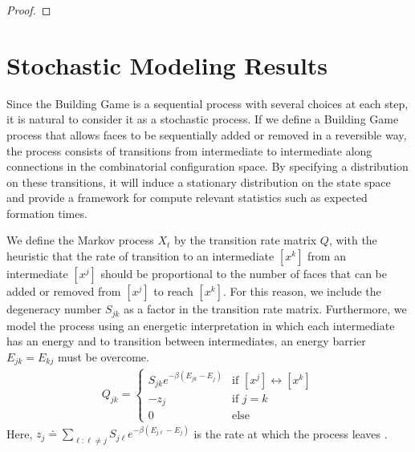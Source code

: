 \begin{proof}
\end{proof}


\section{Stochastic Modeling Results}
\label{sec:StochMod}
Since the Building Game is a sequential process with several choices at each step, it is natural to consider it as a stochastic process. If we define a Building Game process that allows faces to be sequentially added or removed in a reversible way, the process consists of transitions from intermediate to intermediate along connections in the combinatorial configuration space. By specifying a distribution on these transitions, it will induce a stationary distribution on the state space and provide a framework for compute relevant statistics such as expected formation times.





We define the Markov process $X_t$ by the transition rate matrix $Q$, with the heuristic that the rate of transition to an intermediate $[x^k]$ from an intermediate $[x^j]$ should be proportional to the number of faces that can be added or removed from $[x^j]$ to reach $[x^k]$. For this reason, we include the degeneracy number $S_{jk}$ as a factor in the transition rate matrix. Furthermore, we model the process using an energetic interpretation in which each intermediate has an energy and to transition between intermediates, an energy barrier $E_{jk} = E_{kj}$ must be overcome. 
\begin{align}
  \label{eq:Qdef}
  Q_{jk} =
  \begin{cases}
   S_{jk}e^{-\beta\left(E_{jk} - E_{j}\right)} & \text{if } [x^j] \leftrightarrow [x^k]  \\
   -z_j       & \text{if } j = k \\
   0 & \text{else}
  \end{cases}
\end{align}
Here, $z_j \doteq \sum_{\ell: \ell \neq j} S_{j\ell}e^{-\beta\left(E_{j\ell} - E_j\right)}$ is the rate at which the process leaves \xj. 

